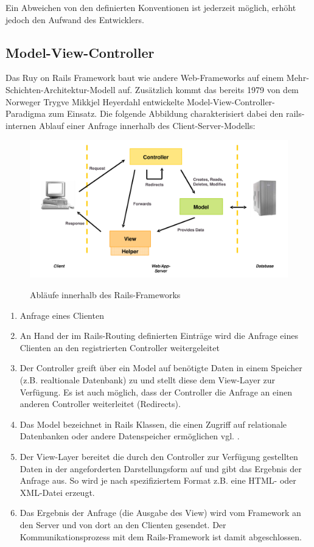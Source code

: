 Ein Abweichen von den definierten Konventionen ist jederzeit möglich, erhöht jedoch den Aufwand des Entwicklers.

\subsection{Model-View-Controller}
\label{sec.mvc}
Das Ruy on Rails Framework baut wie andere Web-Frameworks auf einem Mehr-Schichten-Architektur-Modell auf. Zusätzlich kommt das bereits 1979 von dem Norweger Trygve Mikkjel Heyerdahl entwickelte Model-View-Controller-Paradigma zum Einsatz.
Die folgende Abbildung charakterisiert dabei den rails-internen Ablauf einer Anfrage innerhalb des Client-Server-Modells:

\begin{figure}[!h]
\begin{center}
\label{sec.mvc}
\includegraphics[scale=0.4]{images/analyse/mvc.png}
\caption{Abläufe innerhalb des Rails-Frameworks}
\end{center}
\end{figure}

\begin{enumerate}
\item
Anfrage eines Clienten
\item
An Hand der im Rails-Routing definierten Einträge wird die Anfrage eines Clienten an den registrierten Controller weitergeleitet
\item
Der Controller greift über ein Model auf benötigte Daten in einem Speicher (z.B. realtionale Datenbank) zu und stellt diese dem View-Layer zur Verfügung. Es ist auch möglich, dass der Controller die Anfrage an einen anderen Controller weiterleitet (Redirects).
\item
Das Model bezeichnet in Rails Klassen, die einen Zugriff auf relationale Datenbanken oder andere Datenspeicher ermöglichen vgl. \cite{Rails2}.
\item
Der View-Layer bereitet die durch den Controller zur Verfügung gestellten Daten in der angeforderten Darstellungsform auf und gibt das Ergebnis der Anfrage aus. So wird je nach spezifiziertem Format z.B. eine HTML- oder XML-Datei erzeugt.
\item
Das Ergebnis der Anfrage (die Ausgabe des View) wird vom Framework an den Server und von dort an den Clienten gesendet. Der Kommunikationsprozess mit dem Rails-Framework ist damit abgeschlossen.
\end{enumerate}



